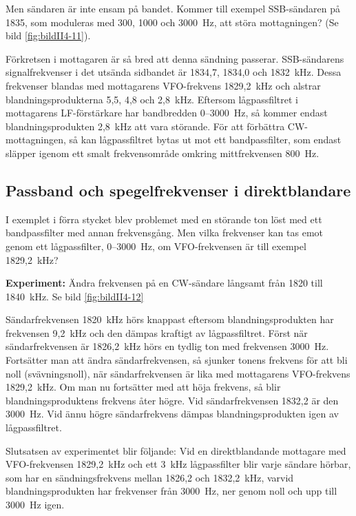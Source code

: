 Men sändaren är inte ensam på bandet.
Kommer till exempel SSB-sändaren på 1835, som moduleras med 300, 1000 och 3000~Hz,
att störa mottagningen?
(Se bild \ref{fig:bildII4-11}).

Förkretsen i mottagaren är så bred att denna sändning passerar.
SSB-sändarens signalfrekvenser i det utsända sidbandet är 1834,7, 1834,0 och
1832~kHz.
Dessa frekvenser blandas med mottagarens VFO-frekvens 1829,2~kHz och alstrar
blandningsprodukterna 5,5, 4,8 och 2,8~kHz.
Eftersom lågpassfiltret i mottagarens LF-förstärkare har bandbredden
0--3000~Hz, så kommer endast blandningsprodukten 2,8~kHz att vara störande.
För att förbättra CW-mottagningen, så kan lågpassfiltret bytas ut mot ett
bandpassfilter, som endast släpper igenom ett smalt frekvensområde omkring
mittfrekvensen 800~Hz.

\subsection{Passband och spegelfrekvenser i direktblandare}

I exemplet i förra stycket blev problemet med en störande ton löst med
ett bandpassfilter med annan frekvensgång.
Men vilka frekvenser kan tas emot genom ett lågpassfilter, 0--3000~Hz,
om VFO-frekvensen är till exempel 1829,2~kHz?

\textbf{Experiment:}
Ändra frekvensen på en CW-sändare långsamt från 1820 till 1840~kHz.
Se bild \ref{fig:bildII4-12}

Sändarfrekvensen 1820~kHz hörs knappast eftersom blandningsprodukten har
frekvensen 9,2~kHz och den dämpas kraftigt av lågpassfiltret.
Först när sändarfrekvensen är 1826,2~kHz hörs en tydlig ton med frekvensen
3000~Hz.
Fortsätter man att ändra sändarfrekvensen, så sjunker tonens frekvens för att
bli noll (svävningsnoll), när sändarfrekvensen är lika med mottagarens
VFO-frekvens 1829,2~kHz.
Om man nu fortsätter med att höja frekvens, så blir blandningsproduktens
frekvens åter högre.
Vid sändarfrekvensen 1832,2 är den 3000~Hz. Vid ännu högre sändarfrekvens
dämpas blandningsprodukten igen av lågpassfiltret.

Slutsatsen av experimentet blir följande:
Vid en direktblandande mottagare med VFO-frekvensen 1829,2~kHz och ett 3~kHz
lågpassfilter blir varje sändare hörbar, som har en sändningsfrekvens mellan
1826,2 och 1832,2~kHz, varvid blandningsprodukten har frekvenser från 3000~Hz, ner
genom noll och upp till 3000~Hz igen.


